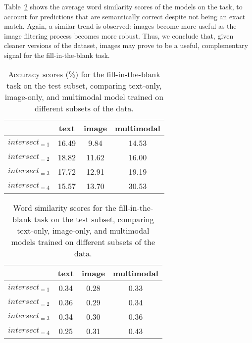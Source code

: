 \documentclass[twocolumn]{svjour3}          \smartqed  \usepackage{graphicx}
\begin{document}
Table~\ref{tbl:gapfilling-similarity} shows the average word similarity scores of the models on the task, to account for predictions that are semantically correct despite not being an exact match. Again, a similar trend is observed: images become more useful as the image filtering process becomes more robust. Thus, we conclude that, given cleaner versions of the dataset, images may prove to be a useful, complementary signal for the fill-in-the-blank task.



\begin{table}[t]
    \caption{Accuracy scores (\%) for the fill-in-the-blank task on the test subset, comparing text-only, image-only, and multimodal model  trained on different subsets of the data. }
    \label{tbl:gapfilling-accuracy}
    \centering
\begin{tabular}{c c c c}
    \toprule
    & \textbf{text} & \textbf{image} & \textbf{multimodal} \\
        \midrule
          $intersect_{=1}$ & 16.49 & 9.84 & 14.53\\
$intersect_{=2}$ & 18.82 & 11.62 & 16.00\\
$intersect_{=3}$ & 17.72 & 12.91 & 19.19\\       
$intersect_{=4}$ & 15.57 & 13.70 & 30.53\\
\bottomrule
    \end{tabular}
\end{table}

\begin{table}[t]
    \caption{Word similarity scores for the fill-in-the-blank task on the test subset, comparing text-only, image-only, and multimodal models trained on different subsets of the data.}
    \label{tbl:gapfilling-similarity}
    \centering
\begin{tabular}{c c c c}
    \toprule
    & \textbf{text} & \textbf{image} & \textbf{multimodal} \\
        \midrule
 $intersect_{=1}$ & 0.34 & 0.28 & 0.33\\
 $intersect_{=2}$ & 0.36 & 0.29 & 0.34\\
 $intersect_{=3}$ & 0.34 & 0.30 & 0.36\\   
 $intersect_{=4}$ & 0.25 & 0.31 & 0.43\\
\bottomrule
    \end{tabular}
\end{table}
\end{document}
